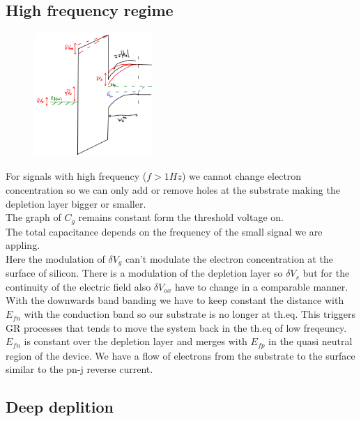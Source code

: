 \subsection{High frequency regime}

\begin{figure}
\includegraphics[width=0.4\textwidth]{hfbd.png}
\end{figure}
For signals with high frequency ($f>1Hz$) we cannot change electron concentration so we can only add or remove holes at the substrate making the depletion layer bigger or smaller.\\ 
The graph of $C_g$ remains constant form the threshold voltage on.\\
The total capacitance depends on the frequency of the small signal we are appling.\\
Here the modulation of $\delta V_g$ can't modulate the electron concentration at the surface of silicon. There is a modulation of the depletion layer so $\delta V_s$ but for the continuity of the electric field also $\delta V_{ox}$ have to change in a comparable manner. With the downwards band banding we have to keep constant the distance with $E_{fn}$ with the conduction band so our substrate is no longer at th.eq. This triggers GR processes that tends to move the system back in the th.eq of low freqeuncy.
$E_{fn}$ is constant over the depletion layer and merges with $E_{fp}$ in the quasi neutral region of the device. We have a flow of electrons from the substrate to the surface similar to the pn-j reverse current.\\

\subsection{Deep deplition}


